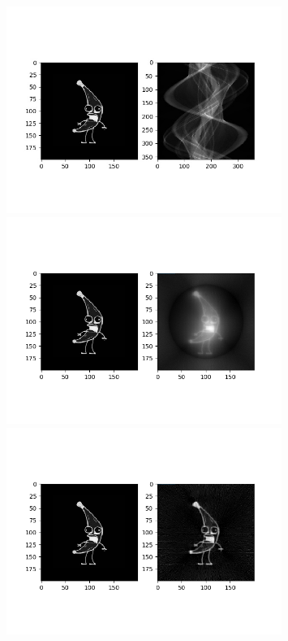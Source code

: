 \documentclass{article}
\begin{document}
\begin{figure}
\begin{center}
\includegraphics[width=0.8\textwidth]{./banana/sinogram.jpg}
\includegraphics[width=0.8\textwidth]{./banana/reconstructedImg.png}
\includegraphics[width=0.8\textwidth]{./banana/reconstructedImg2.png}
\end{center}
\end{figure}
\end{document}
